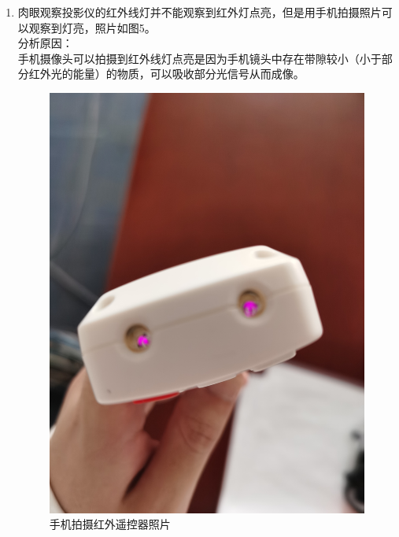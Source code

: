 \documentclass[reqno,a4paper,12pt]{amsart}
\begin{document}
\begin{enumerate}[1.]
\item 肉眼观察投影仪的红外线灯并不能观察到红外灯点亮，但是用手机拍摄照片可以观察到灯亮，照片如图5。 \\
分析原因： \\
手机摄像头可以拍摄到红外线灯点亮是因为手机镜头中存在带隙较小（小于部分红外光的能量）的物质，可以吸收部分光信号从而成像。
\begin{figure}[h]
	\centering
	\includegraphics[width = 120mm]{infrared-ray-lamp.jpeg}
	\caption{手机拍摄红外遥控器照片}
\end{figure}

\end{enumerate}
\end{document}
